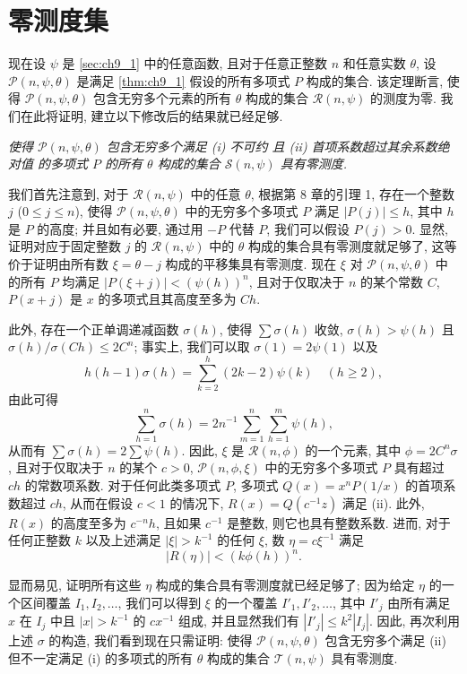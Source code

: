 \section{零测度集}\label{sec:ch9_3}

现在设 $\psi$ 是 \autoref{sec:ch9_1} 中的任意函数, 且对于任意正整数 $n$ 和任意实数 $\theta$, 设 $\mathscr{P}(n, \psi, \theta)$ 是满足 \autoref{thm:ch9_1} 假设的所有多项式 $P$ 构成的集合. 该定理断言, 使得 $\mathscr{P}(n, \psi, \theta)$ 包含无穷多个元素的所有 $\theta$ 构成的集合 $\mathscr{R}(n, \psi)$ 的测度为零. 我们在此将证明, 建立以下修改后的结果就已经足够.

\emph{使得 $\mathscr{P}(n, \psi, \theta)$ 包含无穷多个满足 (i) 不可约 且 (ii) 首项系数超过其余系数绝对值 的多项式 $P$ 的所有 $\theta$ 构成的集合 $\mathscr{S}(n, \psi)$ 具有零测度.}

我们首先注意到, 对于 $\mathscr{R}(n, \psi)$ 中的任意 $\theta$, 根据第 8 章的引理 1, 存在一个整数 $j$ ($0 \le j \le n$), 使得 $\mathscr{P}(n, \psi, \theta)$ 中的无穷多个多项式 $P$ 满足 $|P(j)| \le h$, 其中 $h$ 是 $P$ 的高度; 并且如有必要, 通过用 $-P$ 代替 $P$, 我们可以假设 $P(j) > 0$. 显然, 证明对应于固定整数 $j$ 的 $\mathscr{R}(n, \psi)$ 中的 $\theta$ 构成的集合具有零测度就足够了, 这等价于证明由所有数 $\xi = \theta - j$ 构成的平移集具有零测度. 现在 $\xi$ 对 $\mathscr{P}(n, \psi, \theta)$ 中的所有 $P$ 均满足 $|P(\xi+j)| < (\psi(h))^n$, 且对于仅取决于 $n$ 的某个常数 $C$, $P(x+j)$ 是 $x$ 的多项式且其高度至多为 $Ch$.

此外, 存在一个正单调递减函数 $\sigma(h)$, 使得 $\sum \sigma(h)$ 收敛, $\sigma(h) > \psi(h)$ 且 $\sigma(h)/\sigma(Ch) \le 2C^n$; 事实上, 我们可以取 $\sigma(1) = 2\psi(1)$ 以及
\[h(h-1) \sigma(h) = \sum_{k=2}^{h} (2k-2) \psi(k) \quad (h \geqslant 2),\]
由此可得
\[\sum_{h=1}^{n} \sigma(h) = 2n^{-1} \sum_{m=1}^{n} \sum_{h=1}^{m} \psi(h),\]
从而有 $\sum \sigma(h) = 2\sum \psi(h)$. 因此, $\xi$ 是 $\mathscr{R}(n, \phi)$ 的一个元素, 其中 $\phi = 2C^n\sigma$, 且对于仅取决于 $n$ 的某个 $c > 0$, $\mathscr{P}(n, \phi, \xi)$ 中的无穷多个多项式 $P$ 具有超过 $ch$ 的常数项系数. 对于任何此类多项式 $P$, 多项式 $Q(x) = x^n P(1/x)$ 的首项系数超过 $ch$, 从而在假设 $c < 1$ 的情况下, $R(x) = Q(c^{-1}z)$ 满足 (ii). 此外, $R(x)$ 的高度至多为 $c^{-n}h$, 且如果 $c^{-1}$ 是整数, 则它也具有整数系数. 进而, 对于任何正整数 $k$ 以及上述满足 $|\xi| > k^{-1}$ 的任何 $\xi$, 数 $\eta = c\xi^{-1}$ 满足
\[|R(\eta)| < (k\phi(h))^n.\]

显而易见, 证明所有这些 $\eta$ 构成的集合具有零测度就已经足够了; 因为给定 $\eta$ 的一个区间覆盖 $I_1, I_2, \ldots$, 我们可以得到 $\xi$ 的一个覆盖 $I'_1, I'_2, \ldots$, 其中 $I'_j$ 由所有满足 $x$ 在 $I_j$ 中且 $|x| > k^{-1}$ 的 $cx^{-1}$ 组成, 并且显然我们有 $|I'_j| \leq k^2 |I_j|$. 因此, 再次利用上述 $\sigma$ 的构造, 我们看到现在只需证明: 使得 $\mathscr{P}(n, \psi, \theta)$ 包含无穷多个满足 (ii) 但不一定满足 (i) 的多项式的所有 $\theta$ 构成的集合 $\mathscr{T}(n, \psi)$ 具有零测度.

